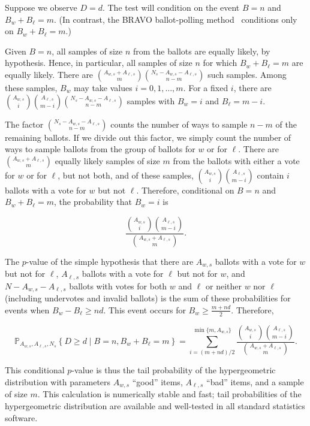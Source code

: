 Suppose we observe $D=d$.
The test will condition on the event $B=n$ and $B_w +B_\ell = m$. 
(In contrast, the BRAVO ballot-polling
method~\citep{lindemanEtal12}
conditions only on $B_w+B_\ell = m$.)

Given $B=n$, all samples of size $n$ from the ballots are equally likely, by hypothesis.
Hence, in particular, all samples of size $n$ for which $B_w + B_\ell = m$ are equally likely.
There are ${A_{w,s}+A_{\ell,s} \choose m}{N_s - A_{w,s}-A_{\ell,s} \choose n-m}$ such samples.
Among these samples, $B_w$ may take values $i=0, 1, \dots, m$.
For a fixed $i$, there are ${A_{w,s} \choose i}{A_{\ell, s} \choose m-i}{N_s - A_{w,s} - A_{\ell,s} \choose n-m}$
samples with $B_w=i$ and $B_\ell = m-i$.

The factor ${N_s - A_{w,s} - A_{\ell,s} \choose n-m}$ counts the number of ways to sample $n-m$ of the
remaining ballots.
If we divide out this factor, we simply count the number of ways to sample ballots
from the group of ballots for $w$ or for $\ell$.
There are ${A_{w,s}+A_{\ell,s} \choose m}$ equally likely samples of size $m$ from
the ballots with either a vote for $w$ or for $\ell$, but not both, 
and of these samples, ${A_{w,s} \choose i}{A_{\ell, s} \choose m-i}$ contain $i$ ballots with a vote for $w$ but not $\ell$.
Therefore, conditional on $B=n$ and $B_w+B_\ell=m$, the probability that $B_w=i$ is

$$\frac{{A_{w,s} \choose i}{A_{\ell, s} \choose m-i}}{{A_{w,s}+A_{\ell,s} \choose m}}.$$

The $p$-value of the simple hypothesis that there are $A_{w,s}$ ballots with
a vote for $w$ but not for $\ell$, $A_{\ell,s}$ ballots with a vote for $\ell$ but not for $w$, 
and $N - A_{w,s} - A_{\ell,s}$ ballots with votes for both $w$ and $\ell$ or neither $w$ nor $\ell$ 
(including undervotes and
invalid ballots) is the sum of these probabilities for events when $B_w - B_\ell \geq nd$.
This event occurs for $B_w \geq \frac{m+nd}{2}$.
Therefore,

\begin{equation}
   \mathbb{P}_{A_{w,s}, A_{\ell,s}, N_s} \left \{ D \geq d \;\vert\; B = n, B_w+B_\ell = m \right \} = 
   \sum_{i=(m+nd)/2}^{\min\{m, A_{w,s}\}} \frac{{A_{w,s} \choose i}{A_{\ell, s} \choose m-i}}{{A_{w,s}+A_{\ell,s} \choose m}}.
\end{equation}


This conditional $p$-value is thus the tail probability of the hypergeometric distribution
with parameters $A_{w,s}$ ``good'' items, $A_{\ell,s}$ ``bad'' items, and a sample of size $m$.
This calculation is numerically stable and fast; tail probabilities of the hypergeometric distribution are available
and well-tested in all standard statistics software.

